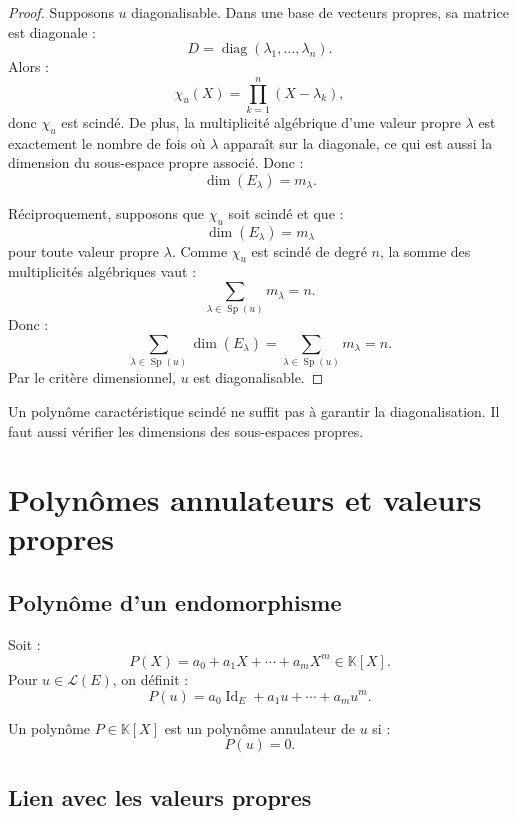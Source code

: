 \documentclass[11pt,a4paper]{article}
\newcommand{\K}{\mathbb K}
\newcommand{\Lcal}{\mathcal L}
\newcommand{\Id}{\operatorname{Id}}
\newcommand{\Sp}{\operatorname{Sp}}
\newcommand{\diag}{\operatorname{diag}}
\begin{document}
\begin{proof}
Supposons \(u\) diagonalisable.  
Dans une base de vecteurs propres, sa matrice est diagonale :
\[
D=\diag(\lambda_1,\dots,\lambda_n).
\]
Alors :
\[
\chi_u(X)=\prod_{k=1}^n(X-\lambda_k),
\]
donc \(\chi_u\) est scindé.  
De plus, la multiplicité algébrique d'une valeur propre \(\lambda\) est exactement le nombre de fois où \(\lambda\) apparaît sur la diagonale, ce qui est aussi la dimension du sous-espace propre associé.  
Donc :
\[
\dim(E_\lambda)=m_\lambda.
\]

Réciproquement, supposons que \(\chi_u\) soit scindé et que :
\[
\dim(E_\lambda)=m_\lambda
\]
pour toute valeur propre \(\lambda\).  
Comme \(\chi_u\) est scindé de degré \(n\), la somme des multiplicités algébriques vaut :
\[
\sum_{\lambda\in\Sp(u)}m_\lambda=n.
\]
Donc :
\[
\sum_{\lambda\in\Sp(u)}\dim(E_\lambda)
=
\sum_{\lambda\in\Sp(u)}m_\lambda
=
n.
\]
Par le critère dimensionnel, \(u\) est diagonalisable.
\end{proof}

\begin{erreurbox}
Un polynôme caractéristique scindé ne suffit pas à garantir la diagonalisation.  
Il faut aussi vérifier les dimensions des sous-espaces propres.
\end{erreurbox}

\section{Polynômes annulateurs et valeurs propres}

\subsection{Polynôme d'un endomorphisme}

\begin{definitionbox}
Soit :
\[
P(X)=a_0+a_1X+\cdots+a_mX^m\in\K[X].
\]
Pour \(u\in\Lcal(E)\), on définit :
\[
P(u)=a_0\Id_E+a_1u+\cdots+a_mu^m.
\]
\end{definitionbox}

\begin{definitionbox}
Un polynôme \(P\in\K[X]\) est un polynôme annulateur de \(u\) si :
\[
P(u)=0.
\]
\end{definitionbox}

\subsection{Lien avec les valeurs propres}
\end{document}
